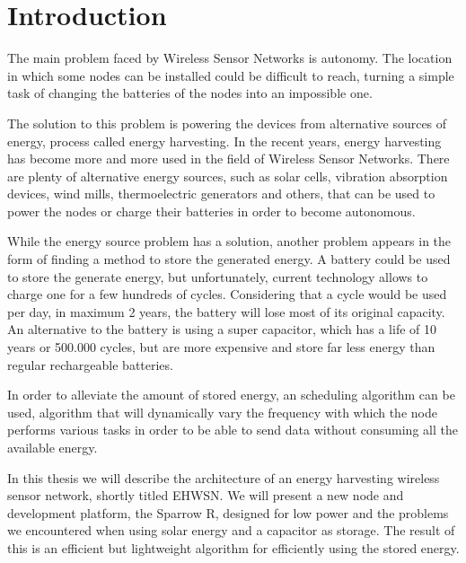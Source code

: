\normalfont\normalsize
\chapter{Introduction}


The main problem faced by Wireless Sensor Networks is autonomy. The location in which some nodes
can be installed could be difficult to reach, turning a simple task of changing the batteries of
the nodes into an impossible one.

The solution to this problem is powering the devices from alternative sources of energy, process
called energy harvesting. In the recent years, energy harvesting has become more and more used in the field of Wireless
Sensor Networks. There are plenty of alternative energy sources, such as solar cells, vibration
absorption devices, wind mills, thermoelectric generators and others, that can be used to power the
nodes or charge their batteries in order to become autonomous.

While the energy source problem has a solution, another problem appears in the form of finding a
method to store the generated energy. A battery could be used to store the generate energy, but
unfortunately, current technology allows to charge one for a few hundreds of cycles.
Considering that a cycle would be used per day, in maximum 2 years, the battery will lose most of
its original capacity. An alternative to the battery is using a super capacitor, which has a life of
10 years or 500.000 cycles, but are more expensive and store far less energy than regular
rechargeable batteries.

In order to alleviate the amount of stored energy, an scheduling algorithm can be used, algorithm
that will dynamically vary the frequency with which the node performs various tasks in order to be
able to send data without consuming all the available energy.

In this thesis we will describe the architecture of an energy harvesting wireless sensor network,
shortly titled EHWSN. We will present a new node and development platform, the Sparrow R, designed
for low power and the problems we encountered when using solar energy and a capacitor as storage. The result of this
is an efficient but lightweight algorithm for efficiently using the stored energy.


